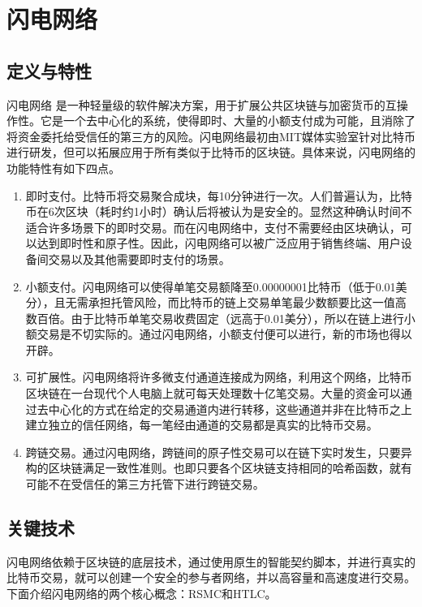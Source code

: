 \documentclass[12pt,a4paper]{article}
\begin{document}
\clearpage

\section{闪电网络}
\subsection{定义与特性}
闪电网络 \cite{poon2016bitcoin} 是一种轻量级的软件解决方案，用于扩展公共区块链与加密货币的互操作性。它是一个去中心化的系统，使得即时、大量的小额支付成为可能，且消除了将资金委托给受信任的第三方的风险。闪电网络最初由MIT媒体实验室针对比特币进行研发，但可以拓展应用于所有类似于比特币的区块链。具体来说，闪电网络的功能特性有如下四点。

\begin{enumerate}
	\item 即时支付。比特币将交易聚合成块，每10分钟进行一次。人们普遍认为，比特币在6次区块（耗时约1小时）确认后将被认为是安全的。显然这种确认时间不适合许多场景下的即时交易。而在闪电网络中，支付不需要经由区块确认，可以达到即时性和原子性。因此，闪电网络可以被广泛应用于销售终端、用户设备间交易以及其他需要即时支付的场景。

	\item 小额支付。闪电网络可以使得单笔交易额降至0.00000001比特币（低于0.01美分），且无需承担托管风险，而比特币的链上交易单笔最少数额要比这一值高数百倍。由于比特币单笔交易收费固定（远高于0.01美分），所以在链上进行小额交易是不切实际的。通过闪电网络，小额支付便可以进行，新的市场也得以开辟。


	\item 可扩展性。闪电网络将许多微支付通道连接成为网络，利用这个网络，比特币区块链在一台现代个人电脑上就可每天处理数十亿笔交易。大量的资金可以通过去中心化的方式在给定的交易通道内进行转移，这些通道并非在比特币之上建立独立的信任网络，每一笔经由通道的交易都是真实的比特币交易。

	\item 跨链交易。通过闪电网络，跨链间的原子性交易可以在链下实时发生，只要异构的区块链满足一致性准则。也即只要各个区块链支持相同的哈希函数，就有可能不在受信任的第三方托管下进行跨链交易。
\end{enumerate}

\subsection{关键技术}
闪电网络依赖于区块链的底层技术，通过使用原生的智能契约脚本，并进行真实的比特币交易，就可以创建一个安全的参与者网络，并以高容量和高速度进行交易。下面介绍闪电网络的两个核心概念：RSMC和HTLC。
\end{document}

